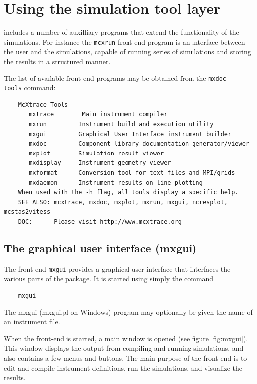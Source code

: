 \section{Using the simulation tool layer}
\label{s:frontends}

\MCX includes a number of auxilliary programs that extend the
functionality of the simulations. For instance the \verb+mcxrun+ front-end program is an interface
between the user and the simulations, capable of running series of simulations and storing the results in a structured manner.

The list of available \MCX front-end programs may be obtained from the \verb+mxdoc --tools+ command:
\begin{verbatim}
    McXtrace Tools
       mxtrace        Main instrument compiler
       mxrun         Instrument build and execution utility
       mxgui         Graphical User Interface instrument builder
       mxdoc         Component library documentation generator/viewer
       mxplot        Simulation result viewer
       mxdisplay     Instrument geometry viewer
       mxformat      Conversion tool for text files and MPI/grids
       mxdaemon      Instrument results on-line plotting
    When used with the -h flag, all tools display a specific help.
    SEE ALSO: mcxtrace, mxdoc, mxplot, mxrun, mxgui, mcresplot, mcstas2vitess
    DOC:      Please visit http://www.mcxtrace.org
\end{verbatim}

\subsection{The graphical user interface (mxgui)}
\label{s:mxgui}

The front-end \verb+mxgui+ provides a graphical user interface that
interfaces the various parts of the \MCX  package. It is started using
simply the command
\begin{verbatim}
    mxgui
\end{verbatim}
The mxgui (mxgui.pl on Windows) program may optionally be given the name of an instrument file.

When the front-end is started, a main window is opened (see figure \ref{fig:mxgui}). This window
displays the output from compiling and running simulations, and also
contains a few menus and buttons. The main purpose of the front-end is
to edit and compile instrument definitions, run the simulations, and
visualize the results.

